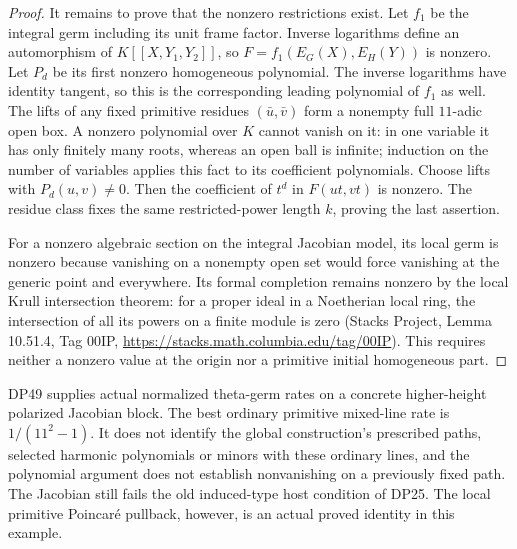\begin{proof}
It remains to prove that the nonzero restrictions exist.
Let $f_1$ be the integral germ including its unit frame factor.
Inverse logarithms define an automorphism of $K[[X,Y_1,Y_2]]$, so
$F=f_1(E_G(X),E_H(Y))$ is nonzero.
Let $P_d$ be its first nonzero homogeneous polynomial.
The inverse logarithms have identity tangent, so this is the corresponding leading polynomial of $f_1$ as well.
The lifts of any fixed primitive residues $(\bar u,\bar v)$ form a nonempty full $11$-adic open box.
A nonzero polynomial over $K$ cannot vanish on it:
in one variable it has only finitely many roots, whereas an open ball is infinite; induction on the number of variables applies this fact to its coefficient polynomials.
Choose lifts with $P_d(u,v)\ne0$.
Then the coefficient of $t^d$ in $F(ut,vt)$ is nonzero.
The residue class fixes the same restricted-power length $k$, proving the last assertion.

For a nonzero algebraic section on the integral Jacobian model, its local germ is nonzero because vanishing on a nonempty open set would force vanishing at the generic point and everywhere.
Its formal completion remains nonzero by the local Krull intersection theorem: for a proper ideal in a Noetherian local ring, the intersection of all its powers on a finite module is zero
(Stacks Project, Lemma 10.51.4, Tag 00IP,
\url{https://stacks.math.columbia.edu/tag/00IP}).
This requires neither a nonzero value at the origin nor a primitive initial homogeneous part.
\end{proof}

DP49 supplies actual normalized theta-germ rates on a concrete higher-height polarized Jacobian block.
The best ordinary primitive mixed-line rate is $1/(11^2-1)$.
It does not identify the global construction's prescribed paths, selected harmonic polynomials or minors with these ordinary lines, and the polynomial argument does not establish nonvanishing on a previously fixed path.
The Jacobian still fails the old induced-type host condition of DP25.
The local primitive Poincar\'e pullback, however, is an actual proved identity in this example.

